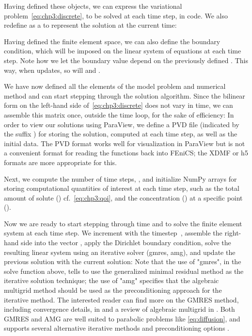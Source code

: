 \noindent Having defined these objects, we can express the variational
problem~\eqref{eq:chp3:discrete}, to be solved at each time step, in
code. We also redefine  as a
 to represent the solution at the current time:

\noindent Having defined the finite element space, we can also define
the boundary condition, which will be imposed on the linear system of
equations at each time step. 
\noindent Note how we let the boundary value
 depend on the previously defined
 . This way, when
 updates, so will  and
.

We have now defined all the elements of the model problem and
numerical method and can start stepping through the solution
algorithm. Since the bilinear form on the left-hand side
of~\eqref{eq:chp3:discrete} does not vary in time, we can assemble
this matrix once, outside the time loop, for the sake of efficiency:  
%
%
In order to view our solutions using ParaView, we define a PVD file 
(indicated by the suffix ) for 
storing the solution, computed at each time step, as well as the initial data. 
\noindent The PVD format works well for visualization in ParaView but is not a
convenient format for reading the functions back into FEniCS; the XDMF
or h5 formats are more appropriate for this.

Next, we compute the number of time steps, , and initialize
NumPy arrays for storing computational quantities of interest at each
time step, such as the total amount of solute ()
cf.~\eqref{eq:chp3:qoi}, and the concentration ()
at a specific point ().

Now we are ready to start stepping through time and to solve the
finite element system at each time step. We increment
 with the timestep~, assemble the
right-hand side into the vector , apply the Dirichlet
boundary condition, solve the resulting linear system using an
iterative solver (gmres, amg), and update the previous solution with
the current solution:  %
Note that the use of "gmres", in the solve function above, tells
{\fenics} to use the generalized minimal residual method as the
iterative solution technique; the use of "amg" specifies that the
algebraic multigrid method should be used as the preconditioning
approach for the iterative method. The interested reader can find more
on the GMRES method, including convergence details, in
\cite{greenbaum1997} and a review of algebraic multigrid in
\cite{stuben2001}. Both GMRES and AMG are well suited to parabolic
problems like \eqref{eq:diffusion}, and {\fenics} supports several
alternative iterative methods and preconditioning options
\cite{langtangen2016solving}. 

